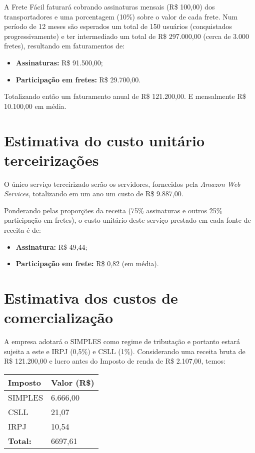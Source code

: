 A Frete Fácil faturará cobrando assinaturas mensais (R\$ 100,00) dos transportadores e uma porcentagem (10\%) sobre o valor de cada frete. Num período de 12 meses são esperados um total de 150 usuários (conquistados progressivamente) e ter intermediado um total de R\$ 297.000,00 (cerca de 3.000 fretes), resultando em faturamentos de:

\begin{itemize}
  \item \textbf{Assinaturas:} R\$ 91.500,00;
  \item \textbf{Participação em fretes:} R\$ 29.700,00.
\end{itemize}

Totalizando então um faturamento anual de R\$ 121.200,00. E mensalmente R\$ 10.100,00 em média.

\section{Estimativa do custo unitário terceirizações}\label{sec:custounitario}

O único serviço terceirizado serão os servidores, fornecidos pela \textit{Amazon Web Services}, totalizando em um ano um custo de R\$ 9.887,00.

Ponderando pelas proporções da receita (75\% assinaturas e outros 25\% participação em fretes), o custo unitário deste serviço prestado em cada fonte de receita é de:

\begin{itemize}
  \item \textbf{Assinatura:} R\$ 49,44;
  \item \textbf{Participação em frete:} R\$ 0,82 (em média).
\end{itemize}

\section{Estimativa dos custos de comercialização}
A empresa adotará o SIMPLES como regime de tributação e portanto estará sujeita a este e IRPJ (0,5\%) e CSLL (1\%). Considerando uma receita bruta de R\$ 121.200,00 e lucro antes do Imposto de renda de R\$ 2.107,00, temos:
\newline \newline
\begin{tabular}{| l | l |}
  \hline
  \textbf{Imposto} & \textbf{Valor (R\$)}\\ \hline
  SIMPLES & 6.666,00 \\ \hline
  CSLL & 21,07 \\ \hline
  IRPJ & 10,54 \\ \hline
  \textbf{Total:} & 6697,61 \\ \hline
\end{tabular}

